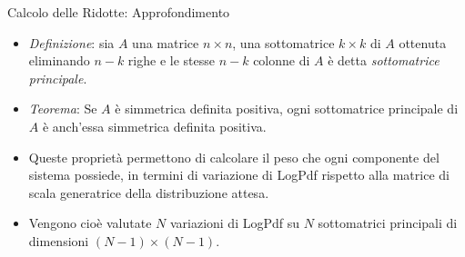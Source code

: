 \documentclass{beamer}
\begin{document}
\begin{frame}
\begin {columns}
\begin{column}{0.8\linewidth}
\begin{block} {Calcolo delle Ridotte: Approfondimento}

\begin{itemize}
\item \textit{Definizione}: sia $A$ una matrice $n \times n$, una sottomatrice $k \times k$ di $A$ ottenuta eliminando $n-k$ righe e le stesse $n-k$ colonne di $A$ è detta \textit{sottomatrice principale}.

\item \textit{Teorema}: Se $A$ è simmetrica definita positiva, ogni sottomatrice principale di $A$ è anch'essa simmetrica definita positiva.

\item Queste proprietà permettono di calcolare il peso che ogni componente del sistema possiede, in termini di variazione di LogPdf rispetto alla matrice di scala generatrice della distribuzione attesa.

\item Vengono cioè valutate $N$ variazioni di LogPdf su $N$ sottomatrici principali di dimensioni $(N-1) \times (N-1)$.

\end{itemize}

\end{block}

\end{column}
\end{columns}
\end{frame}
\end{document}
